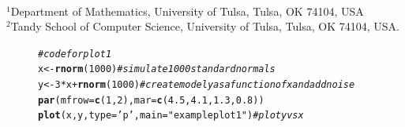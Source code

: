 \documentclass[10pt,letterpaper]{article}\usepackage[]{graphicx}\usepackage[]{color}
\makeatletter
\newcommand{\hlnum}[1]{\textcolor[rgb]{0.686,0.059,0.569}{#1}}%
\newcommand{\hlstr}[1]{\textcolor[rgb]{0.192,0.494,0.8}{#1}}%
\newcommand{\hlcom}[1]{\textcolor[rgb]{0.678,0.584,0.686}{\textit{#1}}}%
\newcommand{\hlopt}[1]{\textcolor[rgb]{0,0,0}{#1}}%
\newcommand{\hlstd}[1]{\textcolor[rgb]{0.345,0.345,0.345}{#1}}%
\newcommand{\hlkwb}[1]{\textcolor[rgb]{0.69,0.353,0.396}{#1}}%
\newcommand{\hlkwc}[1]{\textcolor[rgb]{0.333,0.667,0.333}{#1}}%
\newcommand{\hlkwd}[1]{\textcolor[rgb]{0.737,0.353,0.396}{\textbf{#1}}}%
\newenvironment{kframe}{%
 \def\at@end@of@kframe{}%
 \ifinner\ifhmode%
  \def\at@end@of@kframe{\end{minipage}}%
  \begin{minipage}{\columnwidth}%
 \fi\fi%
 \def\FrameCommand##1{\hskip\@totalleftmargin \hskip-\fboxsep
 \colorbox{shadecolor}{##1}\hskip-\fboxsep
     \hskip-\linewidth \hskip-\@totalleftmargin \hskip\columnwidth}%
 \MakeFramed {\advance\hsize-\width
   \@totalleftmargin\z@ \linewidth\hsize
   \@setminipage}}%
 {\par\unskip\endMakeFramed%
 \at@end@of@kframe}
\newenvironment{knitrout}{}{} %
\makeatother
\begin{document}
{\Large \textbf{}}
\author{Bryan Dawkins$^\text{1}$ and First Last$^\text{2}$}\\
\newline
$^{\text{1}}$Department of Mathematics, University of Tulsa, Tulsa, OK 74104, USA \\
$^{\text{2}}$Tandy School of Computer Science, University of Tulsa, Tulsa, OK 74104, USA.

\begin{figure}[h!]

\begin{tcolorbox}
\centering

\begin{knitrout}
\color{fgcolor}\begin{kframe}
\begin{alltt}
\hlcom{# code for plot 1}
\hlstd{x} \hlkwb{<-} \hlkwd{rnorm}\hlstd{(}\hlnum{1000}\hlstd{)}       \hlcom{# simulate 1000 standard normals}
\hlstd{y} \hlkwb{<-} \hlnum{3}\hlopt{*}\hlstd{x} \hlopt{+} \hlkwd{rnorm}\hlstd{(}\hlnum{1000}\hlstd{)} \hlcom{# create model y as a function of x and add noise}
\hlkwd{par}\hlstd{(}\hlkwc{mfrow}\hlstd{=}\hlkwd{c}\hlstd{(}\hlnum{1}\hlstd{,}\hlnum{2}\hlstd{),}\hlkwc{mar}\hlstd{=}\hlkwd{c}\hlstd{(}\hlnum{4.5}\hlstd{,}\hlnum{4.1}\hlstd{,}\hlnum{1.3}\hlstd{,}\hlnum{0.8}\hlstd{))}
\hlkwd{plot}\hlstd{(x,y,}\hlkwc{type}\hlstd{=}\hlstr{'p'}\hlstd{,}\hlkwc{main}\hlstd{=}\hlstr{"example plot 1"}\hlstd{)} \hlcom{# plot y vs x}


\end{alltt}
\end{kframe}
\end{knitrout}
\end{tcolorbox}
\end{figure}
\end{document}
